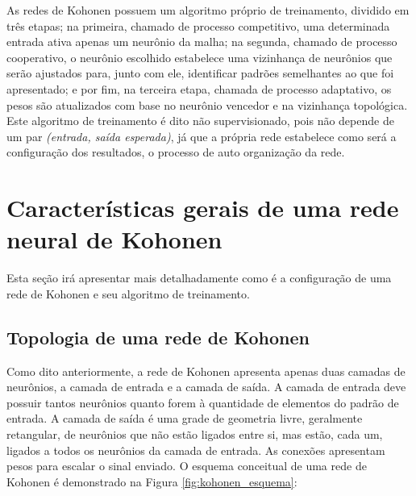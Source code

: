 As redes de Kohonen possuem um algoritmo próprio de treinamento, dividido em
três etapas; na primeira, chamado de processo competitivo, uma determinada entrada
ativa apenas um neurônio da malha; na segunda, chamado de processo cooperativo,
o neurônio escolhido estabelece uma vizinhança de neurônios que serão ajustados
para, junto com ele, identificar padrões semelhantes ao que foi apresentado; e
por fim, na terceira etapa, chamada de processo adaptativo, os pesos são
atualizados com base no neurônio vencedor e na vizinhança topológica. Este
algoritmo de treinamento é dito não supervisionado, pois não depende de um
par \textit{(entrada, saída esperada)}, já que a própria rede estabelece como
será a configuração dos resultados, o processo de auto organização da rede.

\section{Características gerais de uma rede neural de Kohonen}\label{sec:caracteristicas_rede_kohonen}

Esta seção irá apresentar mais detalhadamente como é a configuração de uma rede
de Kohonen e seu algoritmo de treinamento.

\subsection{Topologia de uma rede de Kohonen}

Como dito anteriormente, a rede de Kohonen apresenta apenas duas camadas de
neurônios, a camada de entrada e a camada de saída. A camada de entrada deve
possuir tantos neurônios quanto forem à quantidade de elementos do padrão de
entrada. A camada de saída é uma grade de geometria livre, geralmente
retangular, de neurônios que não estão ligados entre si, mas estão, cada um,
ligados a todos os neurônios da camada de entrada. As conexões apresentam pesos
para escalar o sinal enviado. O esquema conceitual de uma rede de Kohonen é
demonstrado na Figura \ref{fig:kohonen_esquema}:

